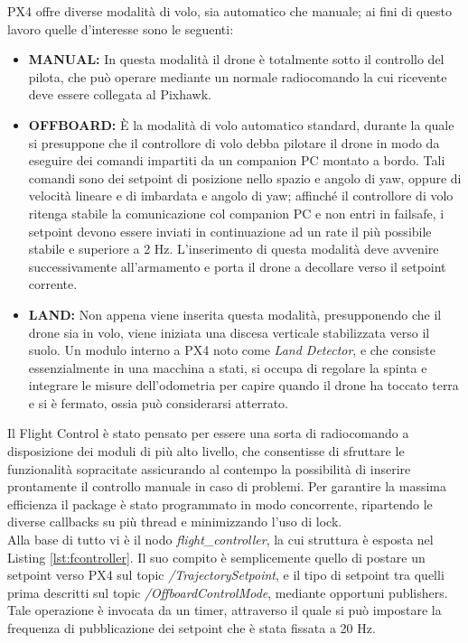 PX4 offre diverse modalità di volo, sia automatico che manuale; ai fini di questo lavoro quelle d'interesse sono le seguenti:
\begin{itemize}
    \item \textbf{MANUAL:} In questa modalità il drone è totalmente sotto il controllo del pilota, che può operare mediante un normale radiocomando la cui ricevente deve essere collegata al Pixhawk.
    \item \textbf{OFFBOARD:} È la modalità di volo automatico standard, durante la quale si presuppone che il controllore di volo debba pilotare il drone in modo da eseguire dei comandi impartiti da un companion PC montato a bordo. Tali comandi sono dei setpoint di posizione nello spazio e angolo di yaw, oppure di velocità lineare e di imbardata e angolo di yaw; affinché il controllore di volo ritenga stabile la comunicazione col companion PC e non entri in failsafe, i setpoint devono essere inviati in continuazione ad un rate il più possibile stabile e superiore a 2 Hz. L'inserimento di questa modalità deve avvenire successivamente all'armamento e porta il drone a decollare verso il setpoint corrente.
    \item \textbf{LAND:} Non appena viene inserita questa modalità, presupponendo che il drone sia in volo, viene iniziata una discesa verticale stabilizzata verso il suolo. Un modulo interno a PX4 noto come \emph{Land Detector}, e che consiste essenzialmente in una macchina a stati, si occupa di regolare la spinta e integrare le misure dell'odometria per capire quando il drone ha toccato terra e si è fermato, ossia può considerarsi atterrato.
\end{itemize}
Il Flight Control è stato pensato per essere una sorta di radiocomando a disposizione dei moduli di più alto livello, che consentisse di sfruttare le funzionalità sopracitate assicurando al contempo la possibilità di inserire prontamente il controllo manuale in caso di problemi. Per garantire la massima efficienza il package è stato programmato in modo concorrente, ripartendo le diverse callbacks su più thread e minimizzando l'uso di lock.\\
Alla base di tutto vi è il nodo \emph{flight\_controller}, la cui struttura è esposta nel Listing \ref{lst:fcontroller}. Il suo compito è semplicemente quello di postare un setpoint verso PX4 sul topic \emph{/TrajectorySetpoint}, e il tipo di setpoint tra quelli prima descritti sul topic \emph{/OffboardControlMode}, mediante opportuni publishers. Tale operazione è invocata da un timer, attraverso il quale si può impostare la frequenza di pubblicazione dei setpoint che è stata fissata a 20 Hz.\\
